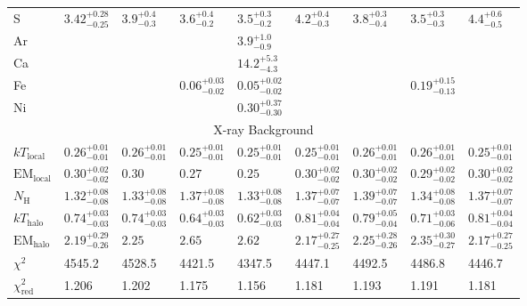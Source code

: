\documentclass[preprint2,tighten,trackchanges]{aastex6}
\newcommand*{\mt}{\mathrm}
\newcommand*{\nH}{N_{\mathrm{H}}}
\newcommand*{\kB}{k}  %
\begin{document}
\begin{table*}[!ht]
\begin{tabular}{@{}lllllllll@{}}
S  & ${3.42}^{+0.28}_{-0.25}$ & ${3.9}^{+0.4}_{-0.3}$    & ${3.6}^{+0.4}_{-0.2}$    & ${3.5}^{+0.3}_{-0.2}$    & ${4.2}^{+0.4}_{-0.3}$    & ${3.8}^{+0.3}_{-0.4}$    & ${3.5}^{+0.3}_{-0.3}$    & ${4.4}^{+0.6}_{-0.5}$ \\ [0.5em]
Ar &                          &                          &                          & ${3.9}^{+1.0}_{-0.9}$    &                          &                          &                          &      \\ [0.5em]
Ca &                          &                          &                          & ${14.2}^{+5.3}_{-4.3}$   &                          &                          &                          &      \\ [0.5em]
Fe &                          &                          & ${0.06}^{+0.03}_{-0.02}$ & ${0.05}^{+0.02}_{-0.02}$ &                          &                          & ${0.19}^{+0.15}_{-0.13}$ &      \\ [0.5em]
Ni &                          &                          &                          & ${0.30}^{+0.37}_{-0.30}$ &                          &                          &                          &      \\
\midrule
\multicolumn{9}{c}{X-ray Background} \\
\midrule
$\kB T_{\mt{local}}$   & ${0.26}^{+0.01}_{-0.01}$ & ${0.26}^{+0.01}_{-0.01}$ & ${0.25}^{+0.01}_{-0.01}$ & ${0.25}^{+0.01}_{-0.01}$ & ${0.25}^{+0.01}_{-0.01}$ & ${0.26}^{+0.01}_{-0.01}$ & ${0.26}^{+0.01}_{-0.01}$ & ${0.25}^{+0.01}_{-0.01}$ \\ [0.5em]
$\mt{EM}_{\mt{local}}$ & ${0.30}^{+0.02}_{-0.02}$ & ${0.30}$ & ${0.27}$ & ${0.25}$ & ${0.30}^{+0.02}_{-0.02}$ & ${0.30}^{+0.02}_{-0.02}$ & ${0.29}^{+0.02}_{-0.02}$ & ${0.30}^{+0.02}_{-0.02}$ \\ [0.5em]
$\nH$                  & ${1.32}^{+0.08}_{-0.08}$ & ${1.33}^{+0.08}_{-0.08}$ & ${1.37}^{+0.08}_{-0.08}$ & ${1.33}^{+0.08}_{-0.08}$ & ${1.37}^{+0.07}_{-0.07}$ & ${1.39}^{+0.07}_{-0.07}$ & ${1.34}^{+0.08}_{-0.08}$ & ${1.37}^{+0.07}_{-0.07}$ \\ [0.5em]
$\kB T_{\mt{halo}}$    & ${0.74}^{+0.03}_{-0.03}$ & ${0.74}^{+0.03}_{-0.03}$ & ${0.64}^{+0.03}_{-0.03}$ & ${0.62}^{+0.03}_{-0.03}$ & ${0.81}^{+0.04}_{-0.04}$ & ${0.79}^{+0.05}_{-0.04}$ & ${0.71}^{+0.03}_{-0.06}$ & ${0.81}^{+0.04}_{-0.04}$ \\ [0.5em]
$\mt{EM}_{\mt{halo}}$  & ${2.19}^{+0.29}_{-0.26}$ & ${2.25}$ & ${2.65}$ & ${2.62}$ & ${2.17}^{+0.27}_{-0.25}$ & ${2.25}^{+0.28}_{-0.26}$ & ${2.35}^{+0.30}_{-0.27}$ & ${2.17}^{+0.27}_{-0.25}$ \\ [0.5em]
$\chi^2$ & 4545.2 & 4528.5 & 4421.5 & 4347.5 & 4447.1 & 4492.5 & 4486.8 & 4446.7 \\ [0.5em]
$\chi^2_{\mt{red}}$ & 1.206 & 1.202 & 1.175 & 1.156 & 1.181 & 1.193 & 1.191 & 1.181 \\
\bottomrule
\end{tabular}

\end{table*}
\end{document}
